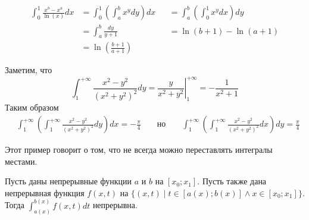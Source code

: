 \documentclass[12pt,a4paper]{article}
\begin{document}
    \begin{example}
        \begin{align*}
            \int_0^1 \frac{x^b - x^a}{\ln(x)} dx
            &= \int_0^1 \left(\int_a^b x^y dy\right) dx&
            &= \int_a^b \left(\int_0^1 x^y dx\right) dy\\
            &= \int_a^b \frac{dy}{y+1}&
            &= \ln(b+1) - \ln(a+1)\\
            &= \ln\left(\frac{b+1}{a+1}\right)
        \end{align*}
    \end{example}

    \begin{example}
        Заметим, что
        \[
            \int_1^{+\infty} \frac{x^2 - y^2}{(x^2 + y^2)^2} dy
            = \left. \frac{y}{x^2 + y^2} \right|_1^{+\infty}
            = - \frac{1}{x^2 + 1}
        \]
        Таким образом
        \begin{align*}
            &\int_1^{+\infty} \left(\int_1^{+\infty} \frac{x^2 - y^2}{(x^2 + y^2)^2} dy\right) dx = -\frac{\pi}{4}&
            &\text{ но }&
            &\int_1^{+\infty} \left(\int_1^{+\infty} \frac{x^2 - y^2}{(x^2 + y^2)^2} dx\right) dy = \frac{\pi}{4}
        \end{align*}
    \end{example}

    \begin{remark*}
        Этот пример говорит о том, что не всегда можно переставлять интегралы местами.
    \end{remark*}

    \begin{theorem}
        Пусть даны непрерывные функции $a$ и $b$ на $[x_0; x_1]$. Пусть также дана непрерывная функция $f(x, t)$ на $\{(x, t) \mid t \in [a(x); b(x)] \wedge x \in [x_0; x_1]\}$. Тогда $\int_{a(x)}^{b(x)} f(x, t) dt$ непрерывна.
    \end{theorem}
\end{document}
